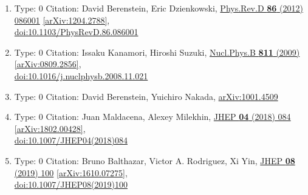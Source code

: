 \documentclass[a4paper,10pt]{article}
\begin{document}
\begin{enumerate}
\begin{enumerate}
  \item Type: 0 Citation: David Berenstein, Eric Dzienkowski, \href{https://www.doi.org/10.1103/PhysRevD.86.086001}{Phys.Rev.D {\bf 86} (2012) 086001}  \href{https://arxiv.org/abs/1204.2788}{[arXiv:1204.2788]},\\\href{https://www.doi.org/10.1103/PhysRevD.86.086001}{doi:10.1103/PhysRevD.86.086001}
  \item Type: 0 Citation: Issaku Kanamori, Hiroshi Suzuki, \href{https://www.doi.org/10.1016/j.nuclphysb.2008.11.021}{Nucl.Phys.B {\bf 811} (2009) }  \href{https://arxiv.org/abs/0809.2856}{[arXiv:0809.2856]},\\\href{https://www.doi.org/10.1016/j.nuclphysb.2008.11.021}{doi:10.1016/j.nuclphysb.2008.11.021}
  \item Type: 0 Citation: David Berenstein, Yuichiro Nakada, \href{https://arxiv.org/abs/1001.4509}{arXiv:1001.4509}
  \item Type: 0 Citation: Juan Maldacena, Alexey Milekhin, \href{https://www.doi.org/10.1007/JHEP04(2018)084}{JHEP {\bf 04} (2018) 084}  \href{https://arxiv.org/abs/1802.00428}{[arXiv:1802.00428]},\\\href{https://www.doi.org/10.1007/JHEP04(2018)084}{doi:10.1007/JHEP04(2018)084}
  \item Type: 0 Citation: Bruno Balthazar, Victor A. Rodriguez, Xi Yin, \href{https://www.doi.org/10.1007/JHEP08(2019)100}{JHEP {\bf 08} (2019) 100}  \href{https://arxiv.org/abs/1610.07275}{[arXiv:1610.07275]},\\\href{https://www.doi.org/10.1007/JHEP08(2019)100}{doi:10.1007/JHEP08(2019)100}

\end{enumerate}
\end{enumerate}
\end{document}
